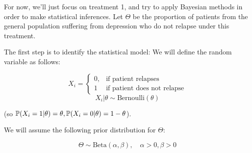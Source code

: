 \documentclass[a4paper]{article}
\begin{document}
                For now, we'll just focus on treatment 1, and try to apply
                Bayesian methods in order to make statistical inferences. Let
                $\Theta$ be the proportion of patients from the general
                population suffering from depression who do not relapse under
                this treatment.

                The first step is to identify the statistical model: We will
                define the random variable as follows:

                $$
                    X_i = \begin{cases}0, & \text{if patient relapses} \\
                    1 & \text{if patient does not relapse}\end{cases}
                $$
                $$
                    X_i | \theta \sim \text{Bernoulli}(\theta)
                $$

                (so $\mathbb{P}(X_i = 1 | \theta) = \theta, \mathbb{P}(X_i = 0 | \theta)
                = 1 - \theta$).

                We will assume the following prior distribution for $\Theta$:

                $$
                    \Theta \sim \text{Beta}(\alpha, \beta), \quad \alpha > 0,
                    \beta > 0
                $$
\end{document}
